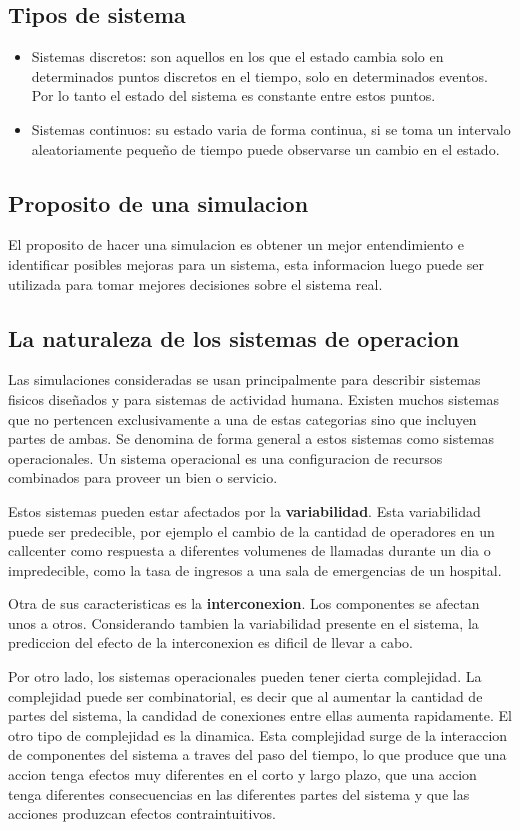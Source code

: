 \documentclass[a4paper]{article}
\begin{document}
\subsection*{Tipos de sistema}
\begin{itemize}
    \item Sistemas discretos: son aquellos en los que el estado cambia solo 
    en determinados puntos discretos en el tiempo, solo en determinados eventos.
    Por lo tanto el estado del sistema es constante entre estos puntos.
    \item Sistemas continuos: su estado varia de forma continua, si se toma un 
    intervalo aleatoriamente pequeño de tiempo puede observarse un cambio en el 
    estado.
\end{itemize}
\subsection{Proposito de una simulacion}
El proposito de hacer una simulacion es obtener un mejor entendimiento e
identificar posibles mejoras para un sistema, esta informacion luego puede
ser utilizada para tomar mejores decisiones sobre el sistema real.

\subsection{La naturaleza de los sistemas de operacion}
Las simulaciones consideradas se usan principalmente para describir
sistemas fisicos diseñados y para sistemas de actividad humana.
Existen muchos sistemas que no pertencen exclusivamente a una de estas
categorias sino que incluyen partes de ambas. Se denomina de forma general
a estos sistemas como sistemas operacionales. Un sistema operacional es
una configuracion de recursos combinados para proveer un bien o servicio.

Estos sistemas pueden estar afectados por la \textbf{variabilidad}. Esta 
variabilidad puede ser predecible, por ejemplo el cambio de la cantidad
de operadores en un callcenter como respuesta a diferentes volumenes de 
llamadas durante un dia o impredecible, como la tasa de ingresos a una
sala de emergencias de un hospital.

Otra de sus caracteristicas es la \textbf{interconexion}. Los componentes
se afectan unos a otros. Considerando tambien la variabilidad presente
en el sistema, la prediccion del efecto de la interconexion es dificil
de llevar a cabo.

Por otro lado, los sistemas operacionales pueden tener cierta complejidad.
La complejidad puede ser combinatorial, es decir que al aumentar la
cantidad de partes del sistema, la candidad de conexiones entre ellas
aumenta rapidamente.
El otro tipo de complejidad es la dinamica. Esta complejidad surge de
la interaccion de componentes del sistema a traves del paso del tiempo,
lo que produce que una accion tenga efectos muy diferentes en el corto y
largo plazo, que una accion tenga diferentes consecuencias en las diferentes
partes del sistema y que las acciones produzcan efectos contraintuitivos.
\end{document}
